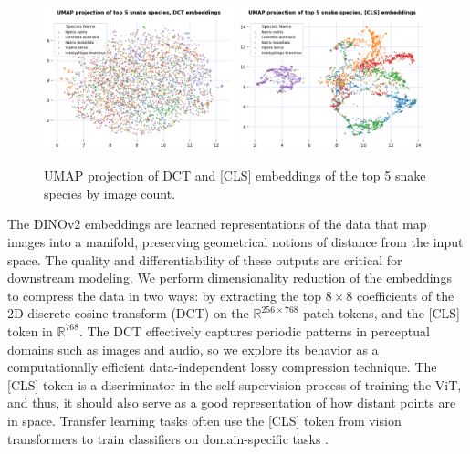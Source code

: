 \documentclass[]{ceurart}
\begin{document}
\begin{figure}[t]
    \centering
    \includegraphics[width=0.49\textwidth]{media/snake_dct_emb_top5.png}
    \includegraphics[width=0.49\textwidth]{media/umap-snake-cls-emb-top5.png}
    \caption{
    UMAP projection of DCT and [CLS] embeddings of the top 5 snake species by image count.
    }
  \label{fig:top5-species}
\end{figure}

The DINOv2 embeddings are learned representations of the data that map images into a manifold, preserving geometrical notions of distance from the input space. 
The quality and differentiability of these outputs are critical for downstream modeling.
We perform dimensionality reduction of the embeddings to compress the data in two ways: by extracting the top $8 \times 8$ coefficients of the 2D discrete cosine transform (DCT) on the $\mathbb{R}^{256 \times 768}$ patch tokens, and the [CLS] token in $\mathbb{R}^{768}$.
The DCT effectively captures periodic patterns in perceptual domains such as images and audio, so we explore its behavior as a computationally efficient data-independent lossy compression technique.
The [CLS] token is a discriminator in the self-supervision process of training the ViT, and thus, it should also serve as a good representation of how distant points are in space.
Transfer learning tasks often use the [CLS] token from vision transformers to train classifiers on domain-specific tasks \cite{oquab2023dinov2}. 
\end{document}
